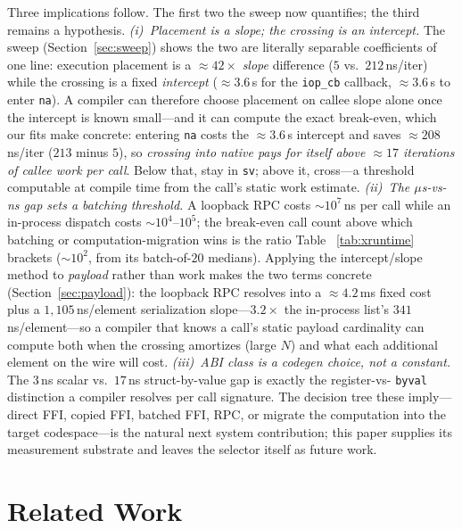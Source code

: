\documentclass[conference]{IEEEtran}
\newcommand{\code}[1]{\texttt{#1}}
\begin{document}
Three implications follow. The first two the sweep now quantifies; the third
remains a hypothesis. \emph{(i)~Placement is a slope; the crossing is an
intercept.} The sweep (Section~\ref{sec:sweep}) shows the two are literally
separable coefficients of one line: execution placement is a
$\approx$$42\times$ \emph{slope} difference ($5$ vs.\ $212$\,ns/iter) while the
crossing is a fixed \emph{intercept} ($\approx$$3.6$\,\textmu s for the
\code{iop\_cb} callback, $\approx$$3.6$\,\textmu s to enter \code{na}). A
compiler can therefore choose placement on callee slope alone once the intercept
is known small---and it can compute the exact break-even, which our fits make
concrete: entering \code{na} costs the $\approx$$3.6$\,\textmu s intercept and
saves $\approx$$208$\,ns/iter ($213$ minus $5$), so \emph{crossing into native
pays for itself above $\approx$$17$ iterations of callee work per call}. Below
that, stay in \code{sv}; above it, cross---a threshold computable at compile time
from the call's static work estimate. \emph{(ii)~The $\mu$s-vs-ns gap
sets a batching threshold.} A loopback RPC costs $\sim$$10^{7}$\,ns per call
while an in-process dispatch costs $\sim$$10^{4}$--$10^{5}$; the break-even call
count above which batching or computation-migration wins is the ratio Table~%
\ref{tab:xruntime} brackets ($\sim$$10^2$, from its batch-of-$20$ medians). Applying the intercept/slope method
to \emph{payload} rather than work makes the two terms concrete
(Section~\ref{sec:payload}): the loopback RPC resolves into a $\approx$$4.2$\,ms
fixed cost plus a $1{,}105$\,ns/element serialization slope---$3.2\times$ the
in-process list's $341$\,ns/element---so a compiler that knows a call's static
payload cardinality can compute both when the crossing amortizes (large $N$) and
what each additional element on the wire will cost. \emph{(iii)~ABI class is a codegen choice,
not a constant.} The
$3$\,ns scalar vs.\ $17$\,ns struct-by-value gap is exactly the register-vs-%
\code{byval} distinction a compiler resolves per call signature. The decision
tree these imply---direct FFI, copied FFI, batched FFI, RPC, or migrate the
computation into the target codespace---is the natural next system contribution;
this paper supplies its measurement substrate and leaves the selector itself as
future work.

\section{Related Work}
\label{sec:related}
\end{document}

